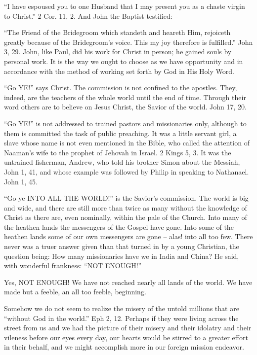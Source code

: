 \documentclass[
]{book}
\begin{document}
``I have espoused you to one Husband that I may present you as a chaste virgin to Christ.'' 2 Cor. 11, 2. And John the Baptist testified: --

``The Friend of the Bridegroom which standeth and heareth Him, rejoiceth greatly because of the Bridegroom's voice. This my joy therefore is fulfilled.'' John 3, 29. John, like Paul, did his work for Christ in person; he gained souls by personal work. It is the way we ought to choose as we have opportunity and in accordance with the method of working set forth by God in His Holy Word.

``Go YE!'' says Christ. The commission is not confined to the apostles. They, indeed, are the teachers of the whole world until the end of time. Through their word others are to believe on Jesus Christ, the Savior of the world. John 17, 20.

``Go YE!'' is not addressed to trained pastors and missionaries only, although to them is committed the task of public preaching. It was a little servant girl, a slave whose name is not even mentioned in the Bible, who called the attention of Naaman's wife to the prophet of Jehovah in Israel. 2 Kings 5, 3. It was the untrained fisherman, Andrew, who told his brother Simon about the Messiah, John 1, 41, and whose example was followed by Philip in speaking to Nathanael. John 1, 45.

``Go ye INTO ALL THE WORLD!'' is the Savior's commission. The world is big and wide, and there are still more than twice as many without the knowledge of Christ as there are, even nominally, within the pale of the Church. Into many of the heathen lands the messengers of the Gospel have gone. Into some of the heathen lands some of our own messengers are gone -- alas! into all too few. There never was a truer answer given than that turned in by a young Christian, the question being: How many missionaries have we in India and China? He said, with wonderful frankness: ``NOT ENOUGH!''

Yes, NOT ENOUGH! We have not reached nearly all lands of the world. We have made but a feeble, an all too feeble, beginning.

Somehow we do not seem to realize the misery of the untold millions that are ``without God in the world.'' Eph 2, 12. Perhaps if they were living across the street from us and we had the picture of their misery and their idolatry and their vileness before our eyes every day, our hearts would be stirred to a greater effort in their behalf, and we might accomplish more in our foreign mission endeavor.
\end{document}
